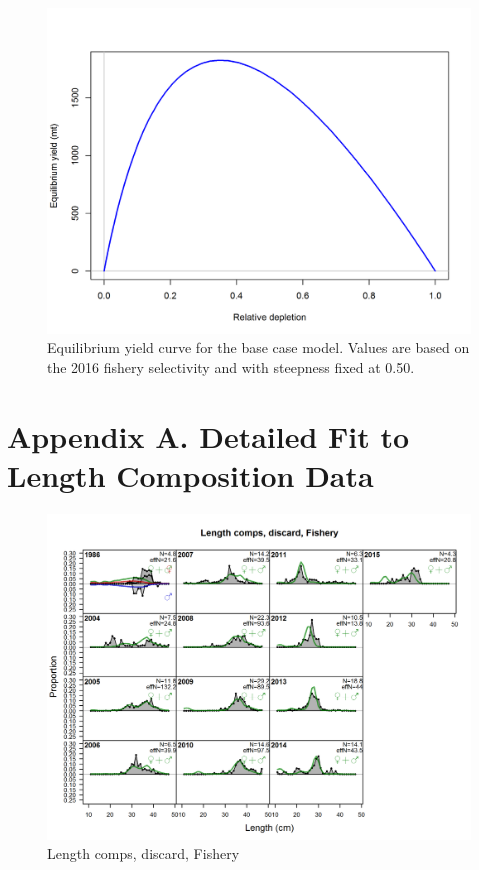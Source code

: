 \documentclass[12pt,]{article}
\begin{document}
\FloatBarrier

\begin{figure}
\centering
\includegraphics{r4ss/plots_mod1/yield1_yield_curve.png}
\caption{Equilibrium yield curve for the base case model. Values are
based on the 2016 fishery selectivity and with steepness fixed at 0.50.
\label{fig:yield}}
\end{figure}

\FloatBarrier

\newpage

\FloatBarrier
\newpage

\section{Appendix A. Detailed Fit to Length Composition
Data}\label{appendix-a.-detailed-fit-to-length-composition-data}

\begin{figure}
\centering
\includegraphics{r4ss/plots_mod1/comp_lenfit_flt1mkt1.png}
\caption{Length comps, discard, Fishery \label{fig:length_fits}}
\end{figure}
\end{document}
